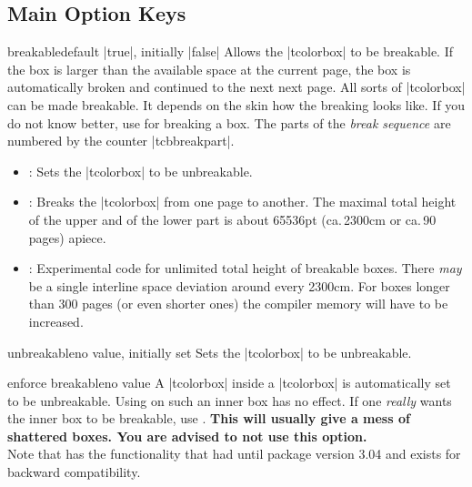 \subsection{Main Option Keys}
\begin{docTcbKey}{breakable}{}{default |true|, initially |false|}
  Allows the |tcolorbox| to be breakable. If the box is larger than the
  available space at the current page, the box is automatically broken
  and continued to the next next page. All sorts of |tcolorbox| can be made
  breakable. It depends on the skin how the breaking looks like.
  If you do not know better, use  for breaking a box.
  The parts of the \emph{break sequence} are numbered
  by the counter |tcbbreakpart|.
  \begin{itemize}
  \item{}: Sets the |tcolorbox| to be unbreakable.
  \item{}: Breaks the |tcolorbox| from one page to another.
    The maximal total height of the upper and of the lower part is
    about 65536pt (ca.\,2300cm or ca.\,90 pages) apiece.
  \item{}: Experimental code for unlimited total height of
    breakable boxes. There \emph{may} be a single interline space deviation around
    every 2300cm. For boxes longer than 300 pages (or even shorter ones) the
    compiler memory will have to be increased.
  \end{itemize}

\begin{dispListing}

\begin{tcolorbox}[breakable,title=My breakable box]
\lipsum[1-6]
\end{tcolorbox}
\end{dispListing}
\end{docTcbKey}
{\tcbusetemp}


\begin{docTcbKey}{unbreakable}{}{no value, initially set}
  Sets the |tcolorbox| to be unbreakable.
\end{docTcbKey}


\begin{docTcbKey}{enforce breakable}{}{no value}
  A |tcolorbox| inside a |tcolorbox| is automatically set to be unbreakable.
  Using  on such an inner box has no effect.
  If one \emph{really} wants the inner box to be breakable, use .
  \textbf{This will usually give a mess of shattered boxes. You are advised to not use this option.}\\
  Note that  has the functionality
  that  had until package version 3.04
  and exists for backward compatibility.
\end{docTcbKey}


